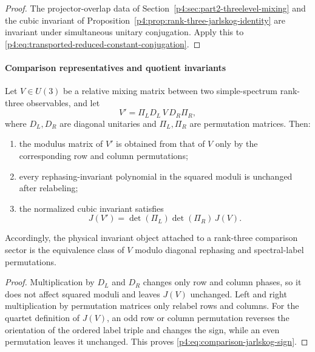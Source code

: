 \documentclass[12pt,a4paper]{article}
\begin{document}
\begin{proof}
The projector-overlap data of Section~\ref{p4:sec:part2-threelevel-mixing} and the cubic invariant of Proposition~\ref{p4:prop:rank-three-jarlskog-identity} are invariant under simultaneous unitary conjugation.
Apply this to \eqref{p4:eq:transported-reduced-constant-conjugation}.
\end{proof}



\paragraph{Comparison representatives and quotient invariants}
\label{p4:sec:part2-comparison-quotient}

\begin{theorem}
\label{p4:thm:comparison-slice-quotient}
Let $V\in U(3)$ be a relative mixing matrix between two simple-spectrum rank-three observables, and let
\begin{equation}
\label{p4:eq:comparison-quotient-transform}
V' = \Pi_L D_L\, V\, D_R \Pi_R,
\end{equation}
where $D_L,D_R$ are diagonal unitaries and $\Pi_L,\Pi_R$ are permutation matrices.
Then:
\begin{enumerate}
\item the modulus matrix of $V'$ is obtained from that of $V$ only by the corresponding row and column permutations;
\item every rephasing-invariant polynomial in the squared moduli is unchanged after relabeling;
\item the normalized cubic invariant satisfies
\begin{equation}
\label{p4:eq:comparison-jarlskog-sign}
J(V') = \det(\Pi_L)\det(\Pi_R)\,J(V).
\end{equation}
\end{enumerate}
Accordingly, the physical invariant object attached to a rank-three comparison sector is the equivalence class of $V$ modulo diagonal rephasing and spectral-label permutations.
\end{theorem}

\begin{proof}
Multiplication by $D_L$ and $D_R$ changes only row and column phases, so it does not affect squared moduli and leaves $J(V)$ unchanged.
Left and right multiplication by permutation matrices only relabel rows and columns.
For the quartet definition of $J(V)$, an odd row or column permutation reverses the orientation of the ordered label triple and changes the sign, while an even permutation leaves it unchanged.
This proves \eqref{p4:eq:comparison-jarlskog-sign}.
\end{proof}
\end{document}
